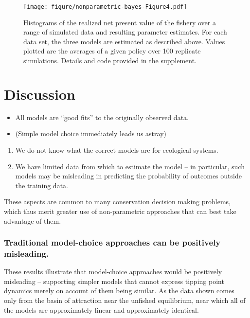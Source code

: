 \documentclass[author-year, review]{elsarticle} %
\makeatletter
\def\maxwidth{\ifdim\Gin@nat@width>\linewidth\linewidth
\else\Gin@nat@width\fi}
\let\Oldincludegraphics\includegraphics
\renewcommand{\includegraphics}[1]{\Oldincludegraphics[width=\maxwidth]{#1}}
\makeatother
\begin{document}
\begin{figure}[htbp]
\centering
\texttt{[image: figure/nonparametric-bayes-Figure4.pdf]}
\caption{Histograms of the realized net present value of the fishery
over a range of simulated data and resulting parameter estimates. For
each data set, the three models are estimated as described above. Values
plotted are the averages of a given policy over 100 replicate
simulations. Details and code provided in the supplement.}
\end{figure}

\section{Discussion}\label{discussion}

\begin{itemize}
\itemsep1pt\parskip0pt
\item
  All models are ``good fits'' to the originally observed data.
\item
  (Simple model choice immediately leads us astray)
\end{itemize}

\begin{enumerate}
\def\labelenumi{\arabic{enumi}.}
\itemsep1pt\parskip0pt
\item
  We do not know what the correct models are for ecological systems.
\item
  We have limited data from which to estimate the model -- in
  particular, such models may be misleading in predicting the
  probability of outcomes outside the training data.
\end{enumerate}

These aspects are common to many conservation decision making problems,
which thus merit greater use of non-parametric approaches that can best
take advantage of them.

\subsubsection{Traditional model-choice approaches can be positively
misleading.}\label{traditional-model-choice-approaches-can-be-positively-misleading.}

These results illustrate that model-choice approaches would be
positively misleading -- supporting simpler models that cannot express
tipping point dynamics merely on account of them being similar. As the
data shown comes only from the basin of attraction near the unfished
equilibrium, near which all of the models are approximately linear and
approximately identical.
\end{document}
